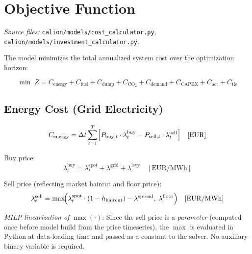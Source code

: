 \documentclass[a4paper,12pt]{article}
\begin{document}
\section{Objective Function}
\label{sec:objective}

\textit{Source files:} \texttt{calion/models/cost\_calculator.py},
\texttt{calion/models/investment\_calculator.py}.

The model minimizes the total annualized system cost over the optimization horizon:

\begin{equation}
  \min \; Z = C_{\text{energy}} + C_{\text{fuel}} + C_{\text{dump}}
             + C_{\text{CO}_2} + C_{\text{demand}}
             + C_{\text{CAPEX}} + C_{\text{act}} + C_{\text{tie}}
  \label{eq:objective}
\end{equation}

\subsection{Energy Cost (Grid Electricity)}

\begin{equation}
  C_{\text{energy}}
  = \Delta t \sum_{t=1}^{T}
    \Bigl[ P_{\text{buy},t} \cdot \lambda^{\text{buy}}_{t}
          - P_{\text{sell},t} \cdot \lambda^{\text{sell}}_{t} \Bigr]
  \quad [\text{EUR}]
  \label{eq:energy-cost}
\end{equation}

\noindent Buy price:
\begin{equation}
  \lambda^{\text{buy}}_{t}
  = \lambda^{\text{spot}}_{t} + \lambda^{\text{grid}} + \lambda^{\text{levy}}
  \quad [\text{EUR/MWh}]
  \label{eq:buy-price}
\end{equation}

\noindent Sell price (reflecting market haircut and floor price):
\begin{equation}
  \lambda^{\text{sell}}_{t}
  = \max\!\Bigl(
      \lambda^{\text{spot}}_{t} \cdot (1 - h_{\text{haircut}})
      - \lambda^{\text{spread}},\;
      \lambda^{\text{floor}}
    \Bigr)
  \quad [\text{EUR/MWh}]
  \label{eq:sell-price}
\end{equation}

\noindent\textit{MILP linearization of} $\max(\cdot)$: Since the sell price is a
\emph{parameter} (computed once before model build from the price timeseries),
the $\max$ is evaluated in Python at data-loading time and passed as a constant
to the solver. No auxiliary binary variable is required.
\end{document}
